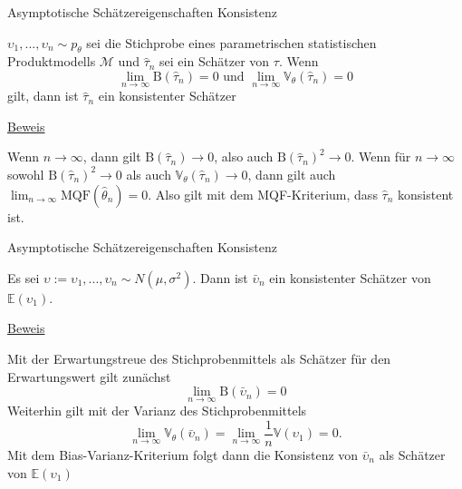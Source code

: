 \documentclass[
  8pt,
  ignorenonframetext,
]{beamer}
\newcommand{\ups} {\upsilon}
\begin{document}
\begin{frame}{\small Asymptotische Schätzereigenschaften \textbar{}
Konsistenz}
\protect\hypertarget{asymptotische-schuxe4tzereigenschaften-konsistenz-2}{}
\small
\begin{theorem}
\normalfont
\justifying
$\ups_1,...,\ups_n \sim p_\theta$ sei die Stichprobe eines parametrischen statistischen
Produktmodells $\mathcal{M}$ und $\hat{\tau}_n$ sei ein Schätzer von $\tau$. Wenn
\begin{equation}
\lim_{n\to \infty} \mbox{B}(\hat{\tau}_n) = 0
\mbox{ und }
\lim_{n\to \infty} \mathbb{V}_\theta(\hat{\tau}_n) = 0
\end{equation}
gilt, dann ist $\hat{\tau}_n$ ein konsistenter Schätzer
\end{theorem}
\footnotesize

\underline{Beweis}

Wenn \(n \to \infty\), dann gilt \(\mbox{B}(\hat{\tau}_n) \to 0\), also
auch \(\mbox{B}(\hat{\tau}_n)^2 \to 0\). Wenn für \(n \to \infty\)
sowohl \(\mbox{B}(\hat{\tau}_n)^2 \to 0\) als auch
\(\mathbb{V}_\theta(\hat{\tau}_n) \to 0\), dann gilt auch
\(\lim_{n\to \infty} \mbox{MQF}(\hat{\theta}_n) = 0\). Also gilt mit dem
MQF-Kriterium, dass \(\hat{\tau}_n\) konsistent ist.
\end{frame}

\begin{frame}{\small Asymptotische Schätzereigenschaften \textbar{}
Konsistenz}
\protect\hypertarget{asymptotische-schuxe4tzereigenschaften-konsistenz-3}{}
\small
\begin{theorem} 
\justifying
\normalfont
Es sei $\ups := \ups_1,...,\ups_n \sim N(\mu,\sigma^2)$. Dann ist $\bar{\ups}_n$
ein konsistenter Schätzer von $\mathbb{E}(\ups_1)$.
\end{theorem}
\footnotesize

\underline{Beweis}

Mit der Erwartungstreue des Stichprobenmittels als Schätzer für den
Erwartungswert gilt zunächst \begin{equation}
\lim_{n \to \infty} \mbox{B}(\bar{\ups}_n) =  0
\end{equation} Weiterhin gilt mit der Varianz des Stichprobenmittels
\begin{equation}
\lim_{n \to \infty} \mathbb{V}_\theta(\bar{\ups}_n) = \lim_{n\to \infty} \frac{1}{n}\mathbb{V}(\ups_1) = 0.
\end{equation} Mit dem Bias-Varianz-Kriterium folgt dann die Konsistenz
von \(\bar{\ups}_n\) als Schätzer von \(\mathbb{E}(\ups_1)\)
\end{frame}
\end{document}
